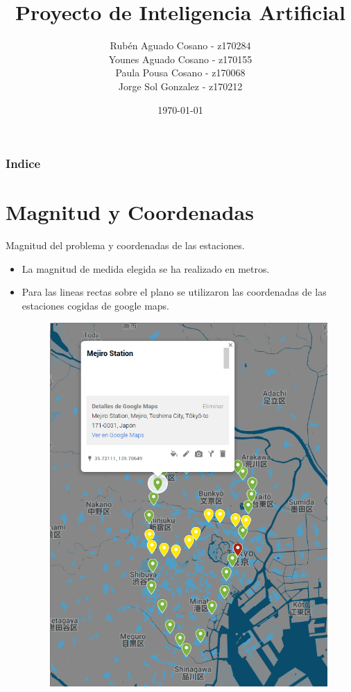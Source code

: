 \documentclass{beamer}
\title[Short title]{Proyecto de Inteligencia Artificial}
\author{Rubén Aguado Cosano - z170284 \\ Younes Aguado Cosano - z170155 \\ Paula Pousa Cosano - z170068 \\ Jorge Sol Gonzalez - z170212}
\institute[ETSIINF UPM] 
{
  \textcolor{upmBlue}{Universidad Politecnica de Madrid}\\
\medskip
}
\date{\today}
\begin{document}
\begin{frame}
\titlepage
\end{frame}

\begin{frame}
\frametitle{Indice}
\tableofcontents
\end{frame}



\section{Magnitud y Coordenadas}
\begin{frame}{Magnitud del problema y coordenadas de las estaciones.}
    \begin{itemize}
        \item La magnitud de medida elegida se ha realizado en metros.
        \item Para las lineas rectas sobre el plano se utilizaron las coordenadas de las estaciones cogidas de google maps.
        \vspace{0.5cm}
        \begin{figure}[H]
         \centering
         \includegraphics[scale=0.20]{"../pics/ejemploCoordenadas.png"}
        \end{figure}
    \end{itemize}
\end{frame}
\end{document}
